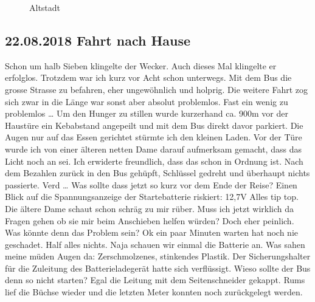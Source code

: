 \begin{figure}[H]
   \centering
   \quad
   \quad
   \caption[Altstadt]{Altstadt}
\end{figure}

\newpage

\subsection{22.08.2018 Fahrt nach Hause}
Schon um halb Sieben klingelte der Wecker.
Auch dieses Mal klingelte er erfolglos.
Trotzdem war ich kurz vor Acht schon unterwegs.
Mit dem Bus die grosse Strasse zu befahren, eher ungewöhnlich und holprig.
Die weitere Fahrt zog sich zwar in die Länge war sonst aber absolut problemlos.
Fast ein wenig zu problemlos \dots
Um den Hunger zu stillen wurde kurzerhand ca. 900m vor der Haustüre ein Kebabstand angepeilt und mit dem Bus direkt davor parkiert.
Die Augen nur auf das Essen gerichtet stürmte ich den kleinen Laden.
Vor der Türe wurde ich von einer älteren netten Dame darauf aufmerksam gemacht, dass das Licht noch an sei.
Ich erwiderte freundlich, dass das schon in Ordnung ist.
Nach dem Bezahlen zurück in den Bus gehüpft, Schlüssel gedreht und überhaupt nichts passierte.
Verd \dots
Was sollte dass jetzt so kurz vor dem Ende der Reise?
Einen Blick auf die Spannungsanzeige der Startebatterie riskiert: 12,7V
Alles tip top.
Die ältere Dame schaut schon schräg zu mir rüber.
Muss ich jetzt wirklich da Fragen gehen ob sie mir beim Anschieben helfen würden?
Doch eher peinlich.
Was könnte denn das Problem sein?
Ok ein paar Minuten warten hat noch nie geschadet.
Half alles nichts.
Naja schauen wir einmal die Batterie an.
Was sahen meine müden Augen da:
Zerschmolzenes, stinkendes Plastik.
Der Sicherungshalter für die Zuleitung des Batterieladegerät hatte sich verflüssigt.
Wieso sollte der Bus denn so nicht starten?
Egal die Leitung mit dem Seitenschneider gekappt.
Rums lief die Büchse wieder und die letzten Meter konnten noch zurückgelegt werden.

